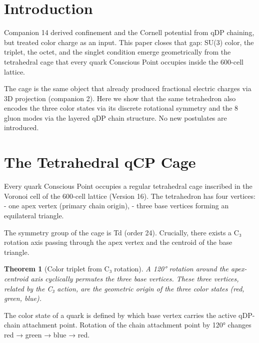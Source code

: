 \documentclass[12pt]{article}
\newtheorem{theorem}{Theorem}[section]
\begin{document}
\section{Introduction}

Companion 14 derived confinement and the Cornell potential from qDP chaining, but treated color charge as an input. This paper closes that gap: SU(3) color, the triplet, the octet, and the singlet condition emerge geometrically from the tetrahedral cage that every quark Conscious Point occupies inside the 600-cell lattice.

The cage is the same object that already produced fractional electric charges via 3D projection (companion 2). Here we show that the same tetrahedron also encodes the three color states via its discrete rotational symmetry and the 8 gluon modes via the layered qDP chain structure. No new postulates are introduced.

\section{The Tetrahedral qCP Cage}

Every quark Conscious Point occupies a regular tetrahedral cage inscribed in the Voronoi cell of the 600-cell lattice (Version 16). The tetrahedron has four vertices:
- one apex vertex (primary chain origin),
- three base vertices forming an equilateral triangle.

The symmetry group of the cage is Td (order 24). Crucially, there exists a C₃ rotation axis passing through the apex vertex and the centroid of the base triangle.

\begin{theorem}[Color triplet from C₃ rotation]
A 120° rotation around the apex-centroid axis cyclically permutes the three base vertices. These three vertices, related by the C₃ action, are the geometric origin of the three color states (red, green, blue).
\end{theorem}

The color state of a quark is defined by which base vertex carries the active qDP-chain attachment point. Rotation of the chain attachment point by 120° changes red → green → blue → red.
\end{document}
